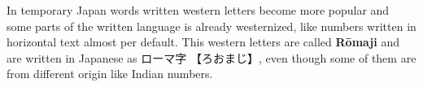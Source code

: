 

In temporary Japan words written western letters become more popular and some
parts of the written language is already westernized, like numbers written in
horizontal text almost per default.  This western letters are called
\textbf{Rōmaji} and are written in Japanese as {ローマ字} {【ろおまじ】}, even
though some of them are from different origin like Indian numbers.


